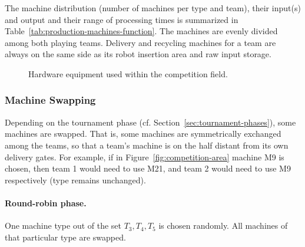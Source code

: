 \documentclass[12pt,twoside]{article}
\newcommand{\refsec}[1]{Section~\ref{#1}}
\newcommand{\reffig}[1]{Figure~\ref{#1}}
\begin{document}
The machine distribution (number of machines per type and team), their
input(s) and output and their range of processing times is summarized
in Table~\ref{tab:production-machines-function}. The machines are
evenly divided among both playing teams. Delivery and recycling
machines for a team are always on the same side as its robot insertion
area and raw input storage.
\begin{figure}
  \quad\quad
  \caption{Hardware equipment used within the competition field.}
  \label{fig:puck-machine}
\end{figure}

\subsubsection{Machine Swapping}
\label{sec:machine-swapping}
Depending on the tournament phase
(cf. \refsec{sec:tournament-phases}), some machines are swapped. That
is, some machines are symmetrically exchanged among the teams, so that
a team's machine is on the half distant from its own delivery
gates. For example, if in \reffig{fig:competition-area} machine M9 is
chosen, then team 1 would need to use M21, and team 2 would need to
use M9 respectively (type remains unchanged).

\vspace*{-1ex}
\paragraph{Round-robin phase.~}
One machine type out of the set ${T_3, T_4, T_5}$ is chosen
randomly. All machines of that particular type are swapped.
\end{document}
